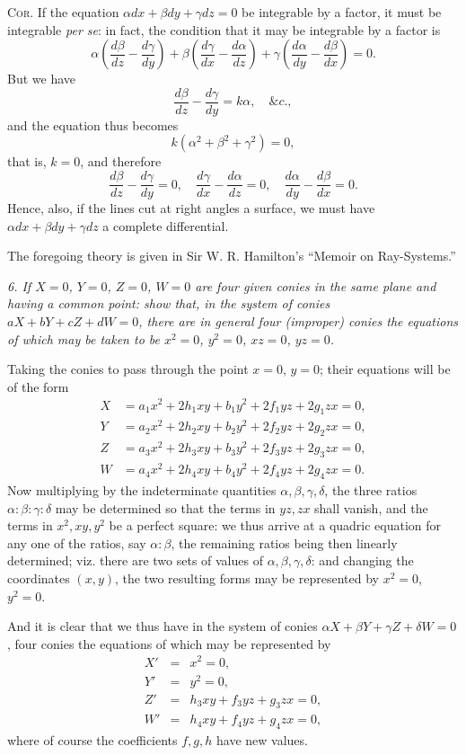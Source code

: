 \documentclass[11pt,a4paper]{article}
\theoremstyle{plain}
\theoremstyle{definition}
\newcommand{\diff}[2]{\frac{d#1}{d#2}}
\begin{document}
\textsc{Cor.} If the equation $\alpha dx+\beta dy+\gamma dz=0$ be integrable by a factor, it must be integrable \textit{per se}: in fact, the condition that it may be integrable by a factor is
\[
\alpha\left(\diff{\beta}{z}-\diff{\gamma}{y}\right)
+\beta\left(\diff{\gamma}{x}-\diff{\alpha}{z}\right)
+\gamma\left(\diff{\alpha}{y}-\diff{\beta}{x}\right)=0.
\]
But we have
\[
\diff{\beta}{z}-\diff{\gamma}{y}=k\alpha,\quad \&c.,
\]
and the equation thus becomes
\[
k(\alpha^2+\beta^2+\gamma^2)=0,
\]
that is, $k=0$, and therefore
\[
\diff{\beta}{z}-\diff{\gamma}{y}=0,\quad
\diff{\gamma}{x}-\diff{\alpha}{z}=0,\quad
\diff{\alpha}{y}-\diff{\beta}{x}=0.
\]
Hence, also, if the lines cut at right angles a surface, we must have $\alpha dx+\beta dy+\gamma dz$ a complete differential.

The foregoing theory is given in Sir W. R. Hamilton's ``Memoir on Ray-Systems.''

\medskip
\noindent\textit{6. If $X=0$, $Y=0$, $Z=0$, $W=0$ are four given conies in the same plane and having a common point: show that, in the system of conies $aX+bY+cZ+dW=0$, there are in general four (improper) conies the equations of which may be taken to be $x^2=0$, $y^2=0$, $xz=0$, $yz=0$.}

\newpage

Taking the conies to pass through the point $x=0$, $y=0$; their equations will be of the form
\[
\begin{aligned}
X&=a_1x^2+2h_1xy+b_1y^2+2f_1yz+2g_1zx=0,\\
Y&=a_2x^2+2h_2xy+b_2y^2+2f_2yz+2g_2zx=0,\\
Z&=a_3x^2+2h_3xy+b_3y^2+2f_3yz+2g_3zx=0,\\
W&=a_4x^2+2h_4xy+b_4y^2+2f_4yz+2g_4zx=0.
\end{aligned}
\]
Now multiplying by the indeterminate quantities $\alpha,\beta,\gamma,\delta$, the three ratios $\alpha:\beta:\gamma:\delta$ may be determined so that the terms in $yz,zx$ shall vanish, and the terms in $x^2,xy,y^2$ be a perfect square: we thus arrive at a quadric equation for any one of the ratios, say $\alpha:\beta$, the remaining ratios being then linearly determined; viz. there are two sets of values of $\alpha,\beta,\gamma,\delta$: and changing the coordinates $(x,y)$, the two resulting forms may be represented by $x^2=0$, $y^2=0$.

And it is clear that we thus have in the system of conies $\alpha X+\beta Y+\gamma Z+\delta W=0$, four conies the equations of which may be represented by
\[
\begin{array}{rcl}
X'&=&x^2=0,\\
Y'&=&y^2=0,\\
Z'&=&h_3xy+f_3yz+g_3zx=0,\\
W'&=&h_4xy+f_4yz+g_4zx=0,
\end{array}
\]
where of course the coefficients $f,g,h$ have new values.
\end{document}

